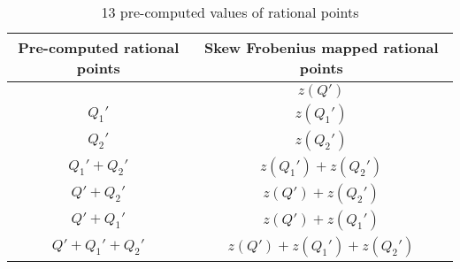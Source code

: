 \renewcommand{\baselinestretch}{1.5}
\begin{table}[!ht]
\centering
\caption{13 pre-computed values of rational points}
\label{pre-compute}
\begin{tabular}{|c|c|}
\hline 
 Pre-computed rational points & Skew Frobenius mapped rational points\\ 
\hline 
 & $z(Q')$ \\ 
\hline 
$Q_1'$ & $z(Q_1')$  \\ 
\hline 
$Q_2'$ & $z(Q_2')$ \\ 
\hline 
$Q_1'+Q_2'$ & \quad  $ z(Q_1')+ z(Q_2') $ \quad \\ 
\hline 
$Q'+Q_2'$ & $ z(Q')+ z(Q_2') $ \\ 
\hline 
$Q'+Q_1'$ & $  z(Q')+ z(Q_1') $ \\ 
\hline 
 \quad $Q'+Q_1'+Q_2'$ \quad  \quad &   \quad  $ z(Q')+ z(Q_1')+ z(Q_2')$  \quad \\ 
\hline 
\end{tabular} 
\end{table}
\renewcommand{\baselinestretch}{1.0}

